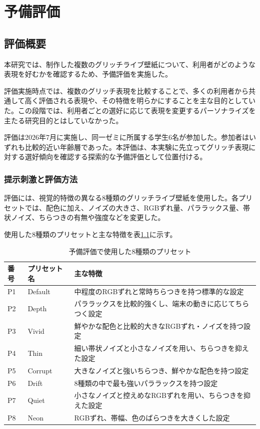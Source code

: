 \chapter{予備評価}

\section{評価概要}

本研究では、制作した複数のグリッチライブ壁紙について、利用者がどのような表現を好むかを確認するため、予備評価を実施した。

評価実施時点では、複数のグリッチ表現を比較することで、多くの利用者から共通して高く評価される表現や、その特徴を明らかにすることを主な目的としていた。この段階では、利用者ごとの選好に応じて表現を変更するパーソナライズを主たる研究目的とはしていなかった。

評価は2026年7月に実施し、同一ゼミに所属する学生6名が参加した。参加者はいずれも比較的近い年齢層であった。本評価は、本実験に先立ってグリッチ表現に対する選好傾向を確認する探索的な予備評価として位置付ける。


\subsection{提示刺激と評価方法}

評価には、視覚的特徴の異なる8種類のグリッチライブ壁紙を使用した。各プリセットでは、配色に加え、ノイズの大きさ、RGBずれ量、パララックス量、帯状ノイズ、ちらつきの有無や強度などを変更した。

使用した8種類のプリセットと主な特徴を表\ref{tab:preliminary_presets}に示す。

\begin{table}[H]
\centering
\caption{予備評価で使用した8種類のプリセット}
\label{tab:preliminary_presets}
\begin{tabular}{lll}
\hline
番号 & プリセット名 & 主な特徴 \\
\hline
P1 & Default & 中程度のRGBずれと常時ちらつきを持つ標準的な設定 \\
P2 & Depth & パララックスを比較的強くし、端末の動きに応じてちらつく設定 \\
P3 & Vivid & 鮮やかな配色と比較的大きなRGBずれ・ノイズを持つ設定 \\
P4 & Thin & 細い帯状ノイズと小さなノイズを用い、ちらつきを抑えた設定 \\
P5 & Corrupt & 大きなノイズと強いちらつき、鮮やかな配色を持つ設定 \\
P6 & Drift & 8種類の中で最も強いパララックスを持つ設定 \\
P7 & Quiet & 小さなノイズと控えめなRGBずれを用い、ちらつきを抑えた設定 \\
P8 & Neon & RGBずれ、帯幅、色のばらつきを大きくした設定 \\
\hline
\end{tabular}
\end{table}

